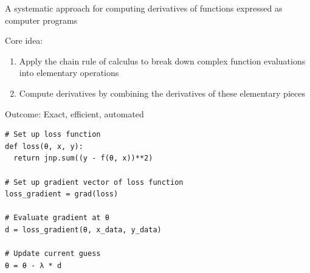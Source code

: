 \begin{frame}

    A systematic approach for computing derivatives of functions expressed as computer programs

        \vspace{0.5em}
    Core idea:

        \vspace{0.5em}
    \begin{enumerate}
        \item Apply the chain rule of calculus to break down complex function evaluations into elementary operations
        \vspace{0.5em}
        \item Compute derivatives by combining the derivatives of these elementary pieces
    \end{enumerate}

        \vspace{0.5em}
        \vspace{0.5em}
        \vspace{0.5em}
    Outcome: Exact, efficient, automated 

\end{frame}

\begin{frame}[fragile]
    
    
    \begin{verbatim}
# Set up loss function
def loss(θ, x, y):
  return jnp.sum((y - f(θ, x))**2)

# Set up gradient vector of loss function
loss_gradient = grad(loss)

# Evaluate gradient at θ
d = loss_gradient(θ, x_data, y_data)

# Update current guess
θ = θ - λ * d
    \end{verbatim}

\end{frame}


